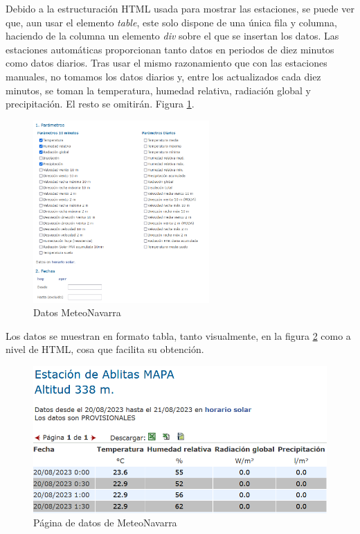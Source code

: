 Debido a la estructuración HTML usada para mostrar las estaciones, se puede ver que, aun usar el elemento \textit{table}, este solo dispone de una única fila y columna, haciendo de la columna un elemento \textit{div} sobre el que se insertan los datos.\newline
\newline
Las estaciones automáticas proporcionan tanto datos en periodos de diez minutos como datos diarios. Tras usar el mismo razonamiento que con las estaciones manuales, no tomamos los datos diarios y, entre los actualizados cada diez minutos, se toman la temperatura, humedad relativa, radiación global y precipitación. El resto se omitirán. Figura \ref{fig:ej6}.

\begin{figure} [H]
	\centering
	\includegraphics[width=0.6\textwidth]{fig/DatosMeteoNavarra.png}
	\caption[Apartado selección de datos MeteoNavarra]{Datos MeteoNavarra}
	\label{fig:ej6}
\end{figure}

Los datos se muestran en formato tabla, tanto visualmente, en la figura \ref{fig:ej29} como a nivel de HTML, cosa que facilita su obtención.

\begin{figure} [H]
	\centering
	\includegraphics[width=.6\linewidth]{fig/MeteoNavarraData.png}
	\caption{Página de datos de MeteoNavarra}
	\label{fig:ej29}
\end{figure}

